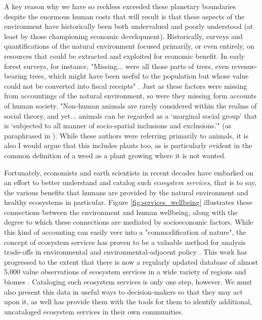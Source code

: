 A key reason why we have so reckless exceeded these planetary boundaries despite the enormous human costs that will result is that these aspects of the environment have historically been both undervalued and poorly understood (at least by those championing economic development). Historically, surveys and quantifications of the natural environment focused primarily, or even entirely, on resources that could be extracted and exploited for economic benefit. In early forest surveys, for instance, "Missing... were all those parts of trees, even revenue-bearing trees, which might have been useful to the population but whose value could not be converted into fiscal receipts" \cite{scottSeeingStateHow2020}. Just as these factors were missing from accountings of the natural environment, so were they missing form accounts of human society. "Non-human animals are rarely considered within the realms of social theory, and yet... animals can be regarded as a `marginal social group' that is `subjected to all manner of socio-spatial inclusions and exclusions.'" (\cite{philolAnimalsGeographyCity1995,westcoatBringingAnimalsBack1995,wolchAnimalGeographiesPlace1998}as paraphrased in \cite{harrisRethinkingMapsMorethanhuman2011}). While these authors were referring primarily to animals, it is also  I would argue that this includes plants too, as is particularly evident in the common definition of a weed as a plant growing where it is not wanted.

Fortunately, economists and earth scientists in recent decades have embarked on an effort to better understand and catalog such \textit{ecosystem services}, that is to say, the various benefits that humans are provided by the natural environment and healthy ecosystems in particular. Figure \ref{fig:services_wellbeing} illustrates these connections between the environment and human wellbeing, along with the degree to which these connections are mediated by socioeconomic factors. While this kind of accounting can easily veer into a "commodification of nature", the concept of ecosystem services has proven to be a valuable method for analysis trade-offs in environmental and environmental-adjacent policy \cite{mccauleySellingOutNature2006, guoEconomicsClimateChange2021}. This work has progressed to the extent that there is now a regularly updated database of almost 5,000 value observations of ecosystem services in a wide variety of regions and biomes \cite{grootEcosystemServicesValuation2020}. Cataloging such ecosystem services is only one step, however. We must also present this data in useful ways to decision-makers  so that they may act upon it, as well has provide them with the tools for them to identify additional, uncataloged ecosystem services in their own communities.

